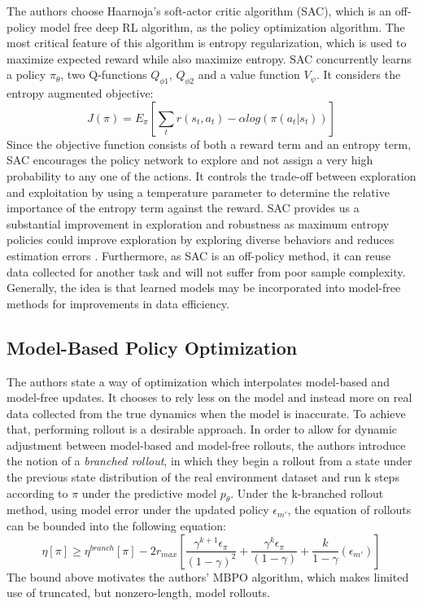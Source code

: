The authors choose Haarnoja's soft-actor critic algorithm (SAC), which is an off-policy model free deep RL algorithm, as the policy optimization algorithm. The most critical feature of this algorithm is entropy regularization, which is used to maximize expected reward while also maximize entropy. 
SAC concurrently learns a policy $\pi_{\theta}$, two Q-functions $Q_{\phi 1}$, $Q_{\phi 2}$ and a value function $V_{\psi}$. It considers the entropy augmented objective:
$$J(\pi) = E_{\pi} \left[\sum_{t}r(s_{t},a_{t}) - \alpha log(\pi(a_{t}|s_{t}))\right]$$
Since the objective function consists of both a reward term and an entropy term, SAC encourages the policy network to explore and not assign a very high probability to any one of the actions. It controls the trade-off between exploration and exploitation by using a temperature parameter to determine the relative importance of the entropy term against the reward. SAC provides us a substantial improvement in exploration and robustness as maximum entropy policies could improve exploration by exploring diverse behaviors and reduces estimation errors \cite{ref8}. Furthermore, as SAC is an off-policy method, it can reuse data collected for another task and will not suffer from poor sample complexity. Generally, the idea is that learned models may be incorporated into model-free methods for improvements in data
efficiency.

\subsection{Model-Based Policy Optimization}

The authors state a way of optimization which interpolates model-based and model-free updates. It chooses to rely less on the model and instead more on real data collected from the true dynamics when the model is inaccurate. To achieve that, performing rollout is a desirable approach. In order to allow for dynamic adjustment between model-based and model-free rollouts, the authors introduce the notion of a \textit{branched rollout}, in which they begin a rollout from a state under the previous state distribution of the real environment dataset and run k steps according to $\pi$ under the predictive model $p_{\theta}$. Under the k-branched rollout method, using model error under the updated policy $\epsilon_{m'}$, the equation of rollouts can be bounded into the following equation:
$$
    \eta[\pi] \geq \eta^{branch}[\pi] - 2r_{max}[\frac{\gamma^{k+1}\epsilon_{\pi}}{(1-\gamma)^2} + \frac{\gamma^{k}\epsilon_{\pi}}{(1-\gamma)} + \frac{k}{1-\gamma}(\epsilon_{m'})]
$$
The bound above motivates the authors' MBPO algorithm, which makes limited use of truncated, but nonzero-length, model rollouts.\\

